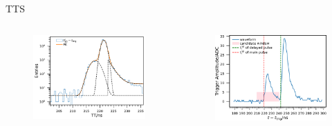 \documentclass[aspectratio=169]{beamer}
\begin{document}
\begin{frame}{TTS}
    \begin{columns}
        \begin{column}{0.33\textwidth}
            \begin{figure}
                \includegraphics[width=\columnwidth]{../figures/method/triggerTTSLog.pdf}    
            \end{figure}
        \end{column}
        \begin{column}{0.33\textwidth}
            \begin{figure}
                \includegraphics[width=\columnwidth]{../figures/method/triggerDoublePulse.pdf}    

\end{figure}
\end{column}
\end{columns}
\end{frame}
\end{document}
